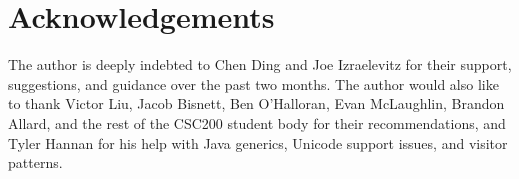 \documentclass{article}
\begin{document}
\section{Acknowledgements}

The author is deeply indebted to Chen Ding and Joe Izraelevitz for their support, suggestions, and guidance over the past two months.
The author would also like to thank Victor Liu, Jacob Bisnett, Ben O'Halloran, Evan McLaughlin, Brandon Allard, and the rest of
the CSC200 student body for their recommendations, and Tyler Hannan for his help with Java generics, Unicode support issues, and
visitor patterns.



\pagebreak
\pagestyle{empty}



\end{document}
